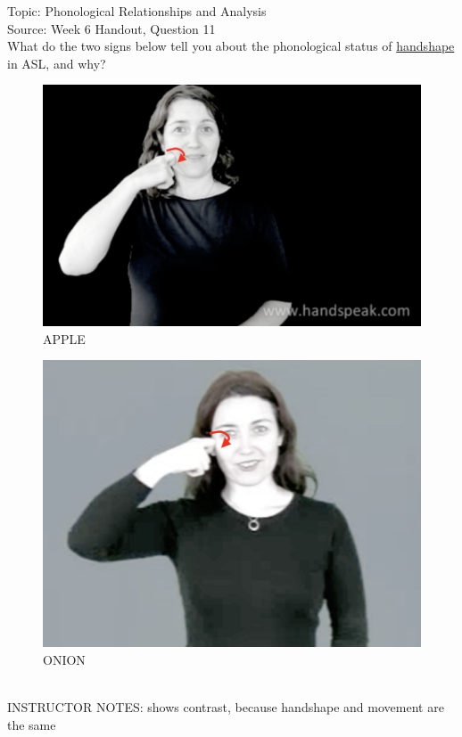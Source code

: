 \documentclass[12pt]{article}
\begin{document}
Topic: Phonological Relationships and Analysis\\
Source: Week 6 Handout, Question 11\\

What do the two signs below tell you about the phonological status of \underline{handshape} in ASL, and why?\\

\begin{figure}[H]
\includegraphics{../images/asl_apple.png}
\caption{APPLE}
\end{figure}
\begin{figure}[H]
\includegraphics{../images/asl_onion.png}
\caption{ONION}
\end{figure}

~\\
INSTRUCTOR NOTES: shows contrast, because handshape and movement are the same
\end{document}
